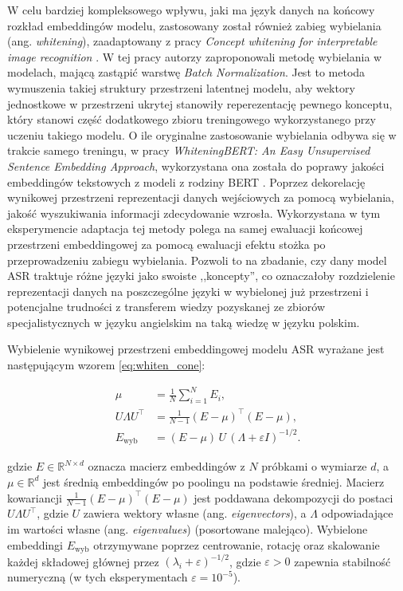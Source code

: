 W celu bardziej kompleksowego wpływu, jaki ma język danych na końcowy rozkład embeddingów modelu, zastosowany został również zabieg wybielania (ang. \textit{whitening}), zaadaptowany z pracy \textit{Concept whitening for interpretable image recognition} \cite{whitening}. W tej pracy autorzy zaproponowali metodę wybielania w modelach, mającą zastąpić warstwę \textit{Batch Normalization}. Jest to metoda wymuszenia takiej struktury przestrzeni latentnej modelu, aby wektory jednostkowe w przestrzeni ukrytej stanowiły reperezentację pewnego konceptu, który stanowi część dodatkowego zbioru treningowego wykorzystanego przy uczeniu takiego modelu. O ile oryginalne zastosowanie wybielania odbywa się w trakcie samego treningu, w pracy \textit{WhiteningBERT: An Easy Unsupervised Sentence Embedding Approach}, wykorzystana ona została do poprawy jakości embeddingów tekstowych z modeli z rodziny BERT \cite{whiteningbert}. Poprzez dekorelację wynikowej przestrzeni reprezentacji danych wejściowych za pomocą wybielania, jakość wyszukiwania informacji zdecydowanie wzrosła. Wykorzystana w tym eksperymencie adaptacja tej metody polega na samej ewaluacji końcowej przestrzeni embeddingowej za pomocą ewaluacji efektu stożka po przeprowadzeniu zabiegu wybielania. Pozwoli to na zbadanie, czy dany model ASR traktuje różne języki jako swoiste ,,koncepty'', co oznaczałoby rozdzielenie reprezentacji danych na poszczególne języki w wybielonej już przestrzeni i potencjalne trudności z transferem wiedzy pozyskanej ze zbiorów specjalistycznych w języku angielskim na taką wiedzę w języku polskim.

Wybielenie wynikowej przestrzeni embeddingowej modelu ASR wyrażane jest następującym wzorem \eqref{eq:whiten_cone}:

\begin{equation}
    \label{eq:whiten_cone}
\begin{aligned}
\mu &= \frac{1}{N}\sum_{i=1}^{N} E_i, \\
U\Lambda U^\top &= \frac{1}{N-1}(E-\mu)^\top(E-\mu), \\
E_{\mathrm{wyb}} &= (E-\mu)\,U\,(\Lambda+\varepsilon I)^{-1/2}.
\end{aligned}
\end{equation}

gdzie $E \in \mathbb{R}^{N \times d}$ oznacza macierz embeddingów z $N$ próbkami o wymiarze $d$, a $\mu \in \mathbb{R}^{d}$ jest średnią embeddingów po poolingu na podstawie średniej. Macierz kowariancji $\frac{1}{N-1}(E-\mu)^\top(E-\mu)$ jest poddawana dekompozycji do postaci $U \Lambda U^\top$, gdzie $U$ zawiera wektory własne (ang. \textit{eigenvectors}), a $\Lambda$ odpowiadające im wartości własne (ang. \textit{eigenvalues}) (posortowane malejąco). Wybielone embeddingi $E_{\mathrm{wyb}}$ otrzymywane poprzez centrowanie, rotację oraz skalowanie każdej składowej głównej przez $(\lambda_i + \varepsilon)^{-1/2}$, gdzie $\varepsilon > 0$ zapewnia stabilność numeryczną (w tych eksperymentach $\varepsilon = 10^{-5}$).


